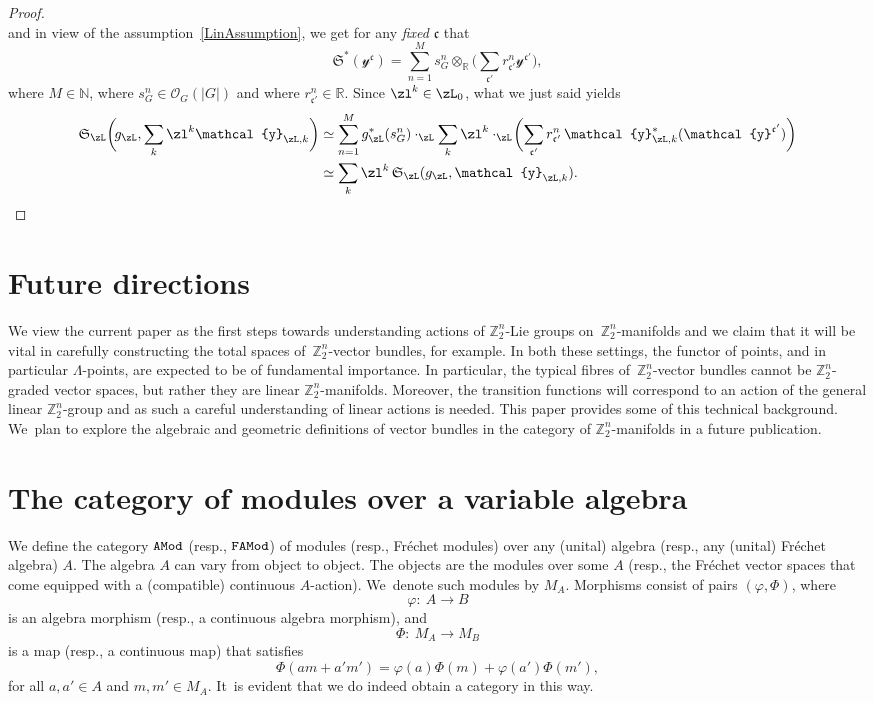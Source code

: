 \documentclass[pdftex]{sigma}%
\newcommand{\R}{{\mathbb R}}
\newcommand{\Z}{{\mathbb Z}}
\def\cO{\mathcal{O}}
\newcommand{\0}{\otimes}
\numberwithin{equation}{section}
\begin{document}
\begin{proof}
\[\]
and in view of the assumption~\eqref{LinAssumption}, we get for any {\it fixed} $\mathfrak{c}$ that
\[
\mathfrak{S}^*(\mathcal{y}^{\mathfrak{c}}) =\sum_{n=1}^{M}s_G^n\0_\R\bigg(\sum_{\mathfrak{c'}}r^n_{\mathfrak{c'}}\mathcal{y}^{\mathfrak{c'}}\bigg),
\]
where $M\in\mathbb{N}$, where $s_G^n\in\cO_G(|G|)$ and where $r^n_{\mathfrak{c'}}\in\R$. Since $\zl^k\in\zL_0$, what we just said yields
\begin{align*}
\mathfrak{S}_\zL\bigg(\!g_\zL,\sum_k\zl^k\mathcal{y}_{\zL,k}\bigg)& \simeq\sum_{n=1}^{M}g^*_\zL(s_G^n) \cdot_\zL\sum_k\zl^k\cdot_\zL\!\bigg(\!\sum_{\mathfrak{c'}}r^n_{\mathfrak{c'}}\,
\mathcal{y}_{\zL,k}^*(\mathcal{y}^{\mathfrak{c'}})\bigg)\\
& \simeq\sum_k\zl^k\, \mathfrak{S}_\zL(g_\zL,\mathcal{y}_{\zL,k}). \tag*{\qed}
\end{align*}
\renewcommand{\qed}{}
\end{proof}


\section{Future directions}
We view the current paper as the first steps towards understanding actions of $\Z_2^n$-Lie groups on~$\Z_2^n$-manifolds and we claim that it will be vital in carefully constructing the total spaces of~$\Z_2^n$-vector bundles, for example. In both these settings, the functor of points, and in particular $\Lambda$-points, are expected to be of fundamental importance. In particular, the typical fibres of~$\Z_2^n$-vector bundles cannot be $\Z_2^n$-graded vector spaces, but rather they are linear $\Z_2^n$-manifolds. Moreover, the transition functions will correspond to an action of the general linear $\Z_2^n$-group and as such a careful understanding of linear actions is needed. This paper provides some of this technical background. We~plan to explore the algebraic and geometric definitions of vector bundles in the category of $\Z_2^n$-manifolds in a future publication.

\appendix
\section{The category of modules over a variable algebra}\label{app:CatModAlg}
We define the category $\tt AMod$ (resp., $\tt FAMod$) of modules (resp., Fr\'echet modules) over any (unital) algebra (resp., any (unital) Fr\'echet algebra) $A$. The algebra $A$ can vary from object to object. The objects are the modules over some $A$ (resp., the Fr\'echet vector spaces that come equipped with a (compatible) continuous $A$-action). We~denote such modules by $M_{A}$. Morphisms consist of pairs $(\varphi , \Phi)$, where
\[
\varphi \colon\ A \longrightarrow B
\]
is an algebra morphism (resp., a continuous algebra morphism), and
\[
\Phi \colon\ M_A \longrightarrow M_B
\]
is a map (resp., a continuous map) that satisfies
\[
\Phi(a m + a'm') = \varphi(a) \Phi(m) + \varphi(a')\Phi(m'),
\]
for all $a,a' \in A$ and $m,m' \in M_A$. It~is evident that we do indeed obtain a category in this way.
%
\end{document}
